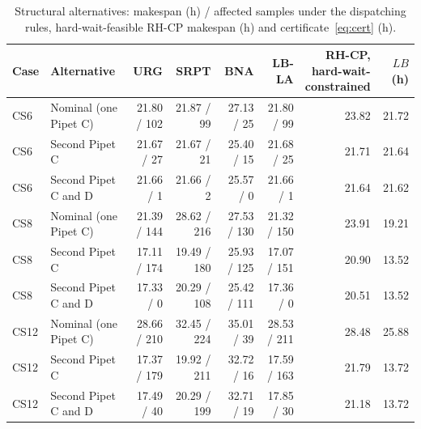 \begin{table}[tbp]
\caption{Structural alternatives: makespan (h) / affected samples under the dispatching rules, hard-wait-feasible RH-CP makespan (h) and certificate~\eqref{eq:cert} (h).\label{tab:design}}
\centering
\footnotesize
\setlength{\tabcolsep}{3pt}
\begin{tabular*}{\textwidth}{@{\extracolsep{\fill}}llrrrrrr@{}}
\toprule
Case & Alternative & URG & SRPT & BNA & LB-LA & \shortstack{RH-CP,\\hard-wait-\\constrained} & \shortstack{$LB$\\(h)}\\
\midrule
CS6 & Nominal (one Pipet C) & 21.80 / 102 & 21.87 / 99 & 27.13 / 25 & 21.80 / 99 & 23.82 & 21.72\\
CS6 & Second Pipet C & 21.67 / 27 & 21.67 / 21 & 25.40 / 15 & 21.68 / 25 & 21.71 & 21.64\\
CS6 & Second Pipet C and D & 21.66 / 1 & 21.66 / 2 & 25.57 / 0 & 21.66 / 1 & 21.64 & 21.62\\
\midrule
CS8 & Nominal (one Pipet C) & 21.39 / 144 & 28.62 / 216 & 27.53 / 130 & 21.32 / 150 & 23.91 & 19.21\\
CS8 & Second Pipet C & 17.11 / 174 & 19.49 / 180 & 25.93 / 125 & 17.07 / 151 & 20.90 & 13.52\\
CS8 & Second Pipet C and D & 17.33 / 0 & 20.29 / 108 & 25.42 / 111 & 17.36 / 0 & 20.51 & 13.52\\
\midrule
CS12 & Nominal (one Pipet C) & 28.66 / 210 & 32.45 / 224 & 35.01 / 39 & 28.53 / 211 & 28.48 & 25.88\\
CS12 & Second Pipet C & 17.37 / 179 & 19.92 / 211 & 32.72 / 16 & 17.59 / 163 & 21.79 & 13.72\\
CS12 & Second Pipet C and D & 17.49 / 40 & 20.29 / 199 & 32.71 / 19 & 17.85 / 30 & 21.18 & 13.72\\
\bottomrule
\end{tabular*}
\end{table}
